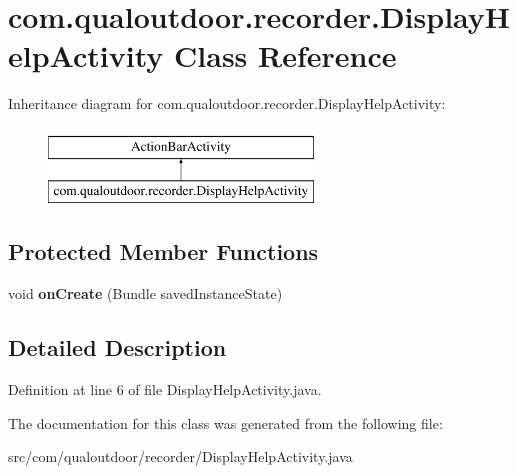 \hypertarget{classcom_1_1qualoutdoor_1_1recorder_1_1DisplayHelpActivity}{\section{com.\-qualoutdoor.\-recorder.\-Display\-Help\-Activity Class Reference}
\label{classcom_1_1qualoutdoor_1_1recorder_1_1DisplayHelpActivity}
}
Inheritance diagram for com.\-qualoutdoor.\-recorder.\-Display\-Help\-Activity\-:\begin{figure}[H]
\begin{center}
\leavevmode
\includegraphics[height=2.000000cm]{classcom_1_1qualoutdoor_1_1recorder_1_1DisplayHelpActivity}
\end{center}
\end{figure}
\subsection*{Protected Member Functions}
\begin{DoxyCompactItemize}
\item 
\hypertarget{classcom_1_1qualoutdoor_1_1recorder_1_1DisplayHelpActivity_a69a3046becdab5fadc808588c4b28ad2}{void {\bfseries on\-Create} (Bundle saved\-Instance\-State)}\label{classcom_1_1qualoutdoor_1_1recorder_1_1DisplayHelpActivity_a69a3046becdab5fadc808588c4b28ad2}

\end{DoxyCompactItemize}


\subsection{Detailed Description}


Definition at line 6 of file Display\-Help\-Activity.\-java.



The documentation for this class was generated from the following file\-:\begin{DoxyCompactItemize}
\item 
src/com/qualoutdoor/recorder/Display\-Help\-Activity.\-java\end{DoxyCompactItemize}
